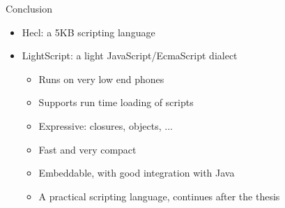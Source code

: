 \documentclass[a4paper,landscape]{slides}
\begin{document}
\begin{slide}
	{\large 
            Conclusion
	\\ \mbox{}}
	\begin{itemize}
            \item Hecl: a 5KB scripting language
            \item LightScript: a light JavaScript/EcmaScript dialect
	    \begin{itemize} \addtolength{\itemsep}{-4pt}
                \item Runs on very low end phones
                \item Supports run time loading of scripts
                \item Expressive: closures, objects, ... 
                \item Fast and very compact
                \item Embeddable, with good integration with Java
                \item A practical scripting language, continues after the thesis
            \end{itemize}
	\end{itemize}
\end{slide}
\end{document}
